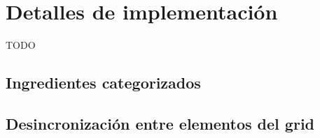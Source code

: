 \section{Detalles de implementación}

TODO

\subsection{Ingredientes categorizados}











\subsection{Desincronización entre elementos del grid}




